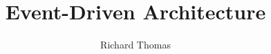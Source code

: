 \documentclass{csse4400}
\title{Event-Driven Architecture}
\author{Richard Thomas}
\date{\week{5}}
\begin{document}
\makecover



%
%
\end{document}
